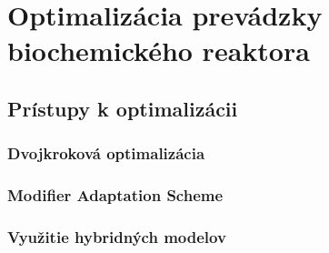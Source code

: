\chapter{Optimalizácia prevádzky biochemického reaktora}
\section{Prístupy k optimalizácii}

\subsection{Dvojkroková optimalizácia}

\subsection{Modifier Adaptation Scheme}

\subsection{Využitie hybridných modelov}



